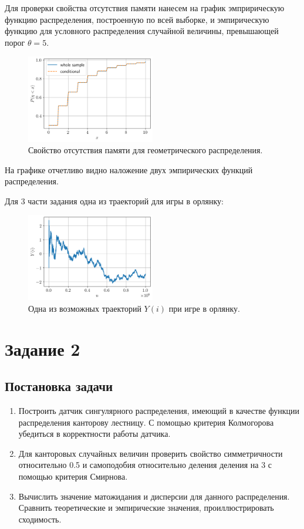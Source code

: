 \documentclass[12pt, a4paper]{article} %
\begin{document}
Для проверки свойства отсутствия памяти нанесем на график эмпририческую функцию распределения, построенную по всей выборке,
и эмпирическую функцию для условного распределения случайной величины, превышающей порог $\theta = 5$.
\begin{figure}[H]
    \centering
    \includegraphics[width=0.5\textwidth]{figures/01_mem.png}
    \caption{Свойство отсутствия памяти для геометрического распределения.}
    \label{fig:01_mem}
\end{figure}
На графике отчетливо видно наложение двух эмпирических функций распределения.

Для 3 части задания одна из траекторий для игры в орлянку:

\begin{figure}[H]
    \centering
    \includegraphics[width=0.5\textwidth]{figures/01_coin.png}
    \caption{Одна из возможных траекторий $Y(i)$ при игре в орлянку.}
    \label{fig:01_coin}
\end{figure}


\section{Задание 2}

\subsection{Постановка задачи}

\begin{enumerate}
\item Построить датчик сингулярного распределения, имеющий в качестве функции распределения канторову лестницу. С помощью критерия Колмогорова убедиться в корректности работы датчика.
\item Для канторовых случайных величин проверить свойство симметричности относительно 0.5 и самоподобия относительно деления деления на 3 с помощью критерия Смирнова.
\item Вычислить значение матожидания и дисперсии для данного распределения. Сравнить теоретические и эмпирические значения, проиллюстрировать сходимость.
\end{enumerate} 
\end{document}
